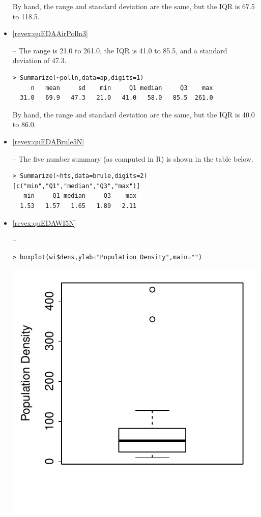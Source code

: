 \documentclass[10pt,openany]{book}\usepackage[]{graphicx}\usepackage[]{color}
\makeatletter
\newenvironment{kframe}{%
 \def\at@end@of@kframe{}%
 \ifinner\ifhmode%
  \def\at@end@of@kframe{\end{minipage}}%
  \begin{minipage}{\columnwidth}%
 \fi\fi%
 \def\FrameCommand##1{\hskip\@totalleftmargin \hskip-\fboxsep
 \colorbox{shadecolor}{##1}\hskip-\fboxsep
     \hskip-\linewidth \hskip-\@totalleftmargin \hskip\columnwidth}%
 \MakeFramed {\advance\hsize-\width
   \@totalleftmargin\z@ \linewidth\hsize
   \@setminipage}}%
 {\par\unskip\endMakeFramed%
 \at@end@of@kframe}
\newenvironment{knitrout}{}{} %
\makeatother
\begin{document}
\begin{itemize}
\noindent By hand, the range and standard deviation are the same, but the IQR is 67.5 to 118.5.

  \item \hypertarget{ans:quEDAAirPolln3}{\ref{revex:quEDAAirPolln3}} -- The range is 21.0 to 261.0, the IQR is 41.0 to 85.5, and a standard deviation of 47.3.
\begin{knitrout}
\color{fgcolor}\begin{kframe}
\begin{verbatim}
> Summarize(~polln,data=ap,digits=1)
     n   mean     sd    min     Q1 median     Q3    max 
  31.0   69.9   47.3   21.0   41.0   58.0   85.5  261.0 
\end{verbatim}
\end{kframe}
\end{knitrout}

\noindent By hand, the range and standard deviation are the same, but the IQR is 40.0 to 86.0.

  \item \hypertarget{ans:quEDABrule5N}{\ref{revex:quEDABrule5N}} -- The five number summary (as computed in R) is shown in the table below.
\begin{knitrout}
\color{fgcolor}\begin{kframe}
\begin{verbatim}
> Summarize(~hts,data=brule,digits=2)[c("min","Q1","median","Q3","max")]
   min     Q1 median     Q3    max 
  1.53   1.57   1.65   1.89   2.11 
\end{verbatim}
\end{kframe}
\end{knitrout}

  \item \hypertarget{ans:quEDAWI5N}{\ref{revex:quEDAWI5N}} --
\begin{knitrout}
\color{fgcolor}\begin{kframe}
\begin{verbatim}
> boxplot(wi$dens,ylab="Population Density",main="")
\end{verbatim}
\end{kframe}

{\centering \includegraphics[width=.4\linewidth]{Figs/BoxplotWIc-1} 

}
\end{knitrout}
\end{itemize}
\end{document}
